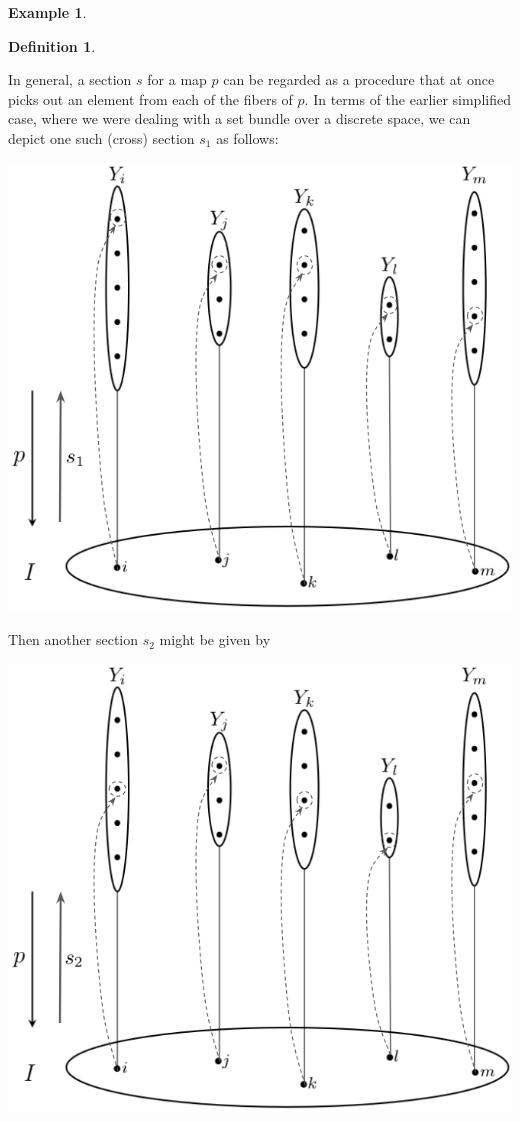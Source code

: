 \documentclass[a4paper]{book}
\theoremstyle{definition}
\newtheorem{example}{Example}[section]
\theoremstyle{definition}
\newtheorem{definition}{Definition}[section]
\theoremstyle{definition}
\theoremstyle{theorem}
\theoremstyle{definition}
\begin{document}
\begin{example}
\begin{definition}
	\end{definition} 
	\noindent  
	In general, a section $s$ for a map $p$ can be regarded as a procedure that at once picks out an element from each of the fibers of $p$. 
	In terms of the earlier simplified case, where we were dealing with a set bundle over a discrete space, we can depict one such (cross) section $s_1$ as follows: 
	\begin{center}
		\includegraphics*[scale=0.3]{FirstSection.png}
	\end{center}
Then another section $s_2$ might be given by
\begin{center}
	\includegraphics*[scale=0.3]{Sec2.png}

\end{center}
\end{example}
\end{document}
